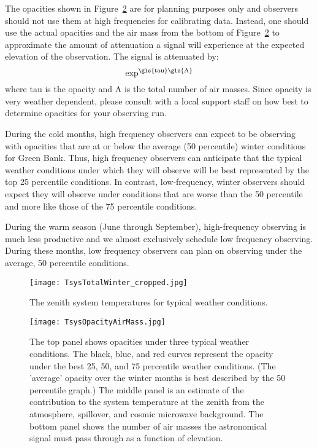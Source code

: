 The opacities shown in Figure~\ref{fig:tsysopacity} are for planning purposes
only and observers should not use them at high frequencies for calibrating data.
Instead, one should use the actual opacities and the air mass from the bottom of
Figure~\ref{fig:tsysopacity} to approximate the amount of attenuation a signal
will experience at the expected elevation of the observation.  The signal is
attenuated by:
\begin{equation}
{\rm \exp^{\gls{tau} \gls{A}}}
\end{equation}
where \gls{tau} is the opacity and \gls{A} is the total number of air masses.
Since opacity is very weather dependent, please consult with a local support
staff on how best to determine opacities for your observing run.

During the cold months, high frequency observers can expect to be observing with
opacities that are  at or below the average (50 percentile) winter conditions for
Green Bank. Thus, high frequency observers can anticipate that the typical weather 
conditions under which they will observe will be best represented by the top 
25 percentile conditions.  In contrast, low-frequency, winter observers 
should expect they will observe under conditions that are worse than the 50 
percentile and more like those of the 75 percentile conditions.

During the warm season (June through September), high-frequency observing is 
much less productive and we almost exclusively schedule low frequency observing.
During these months, low frequency observers can plan on observing under the
average, 50 percentile conditions.

\vspace{-0.25cm}

\begin{figure}[!h]
\begin{center}
\texttt{[image: TsysTotalWinter\_cropped.jpg]}
\caption[Typical system temperatures]
{The zenith system temperatures for typical weather conditions.
\label{fig:tsysweather}}
\end{center}
\end{figure}


\newpage

\begin{figure}[!h]
\begin{center}
\texttt{[image: TsysOpacityAirMass.jpg]}
\caption[Opacity statistics]
{The top panel shows opacities under three typical weather conditions.
The black, blue, and red curves represent the opacity under the best 25, 50, 
and 75 percentile weather conditions.  (The 'average' opacity over the winter 
months is best described by the 50 percentile graph.)
The middle  panel is an estimate of the contribution to the system temperature
at the zenith from the atmosphere, spillover, and cosmic microwave background. 
The bottom panel shows the number of air masses the astronomical signal must 
pass through as a function of elevation.    
\label{fig:tsysopacity}}
\end{center}
\end{figure}

